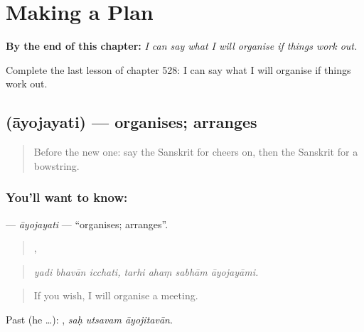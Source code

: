 
\chapter{Making a Plan}
\label{ch:sa-making-a-plan}

\begin{chapteropening}
\textbf{By the end of this chapter:} \emph{I can say what I will organise if things work out.}

Complete the last lesson of chapter 528: I can say what I will organise if things work out.
\end{chapteropening}

\section[\texorpdfstring{\sk{आयोजयति} (āyojayati)}{आयोजयति (āyojayati)}]{ (āyojayati) — organises; arranges}

\label{lesson:SA-C528-ayojayati}



\begin{quote}
Before the new one: say the Sanskrit for cheers on, then the Sanskrit for a bowstring.
\end{quote}

\subsection*{You'll want to know: }
\textbf{} — \emph{āyojayati} — \textquotedblleft{}organises; arranges\textquotedblright{}.

\begin{quote}
  ,    
\end{quote}

\begin{quote}
\emph{yadi bhavān icchati, tarhi ahaṃ sabhām āyojayāmi.}
\end{quote}

\begin{quote}
If you wish, I will organise a meeting.
\end{quote}

Past (he …):   , \emph{saḥ utsavam āyojitavān}.

